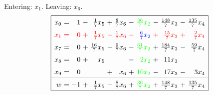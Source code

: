 \documentclass[11pt]{article}
\begin{document}
Entering: $x_{1}$. Leaving: $x_{6}$. 
\begin{equation*}
\renewcommand{\arraystretch}{1.5} %
\begin{array}{|rcrcrcrcrcrcr|}
\hline
x_{0} \mspace{-6mu}&\mspace{-6mu} = \mspace{-6mu}&\mspace{-6mu} 1 \mspace{-6mu}&\mspace{-6mu} - \mspace{-6mu}&\mspace{-6mu} \frac{1}{7} x_{5} \mspace{-6mu}&\mspace{-6mu} + \mspace{-6mu}&\mspace{-6mu} \frac{8}{7} x_{6} \mspace{-6mu}&\mspace{-6mu} - \mspace{-6mu}&\color{green}\mspace{-6mu} \frac{36}{7} x_{2} \mspace{-6mu}&\mspace{-6mu} - \mspace{-6mu}&\mspace{-6mu} \frac{148}{7} x_{3} \mspace{-6mu}&\mspace{-6mu} - \mspace{-6mu}&\mspace{-6mu} \frac{135}{7} x_{4}\\
\color{red}x_{1} \mspace{-6mu}&\color{red}\mspace{-6mu} = \mspace{-6mu}&\color{red}\mspace{-6mu} 0 \mspace{-6mu}&\color{red}\mspace{-6mu} + \mspace{-6mu}&\color{red}\mspace{-6mu} \frac{1}{7} x_{5} \mspace{-6mu}&\color{red}\mspace{-6mu} - \mspace{-6mu}&\color{red}\mspace{-6mu} \frac{1}{7} x_{6} \mspace{-6mu}&\color{red}\mspace{-6mu} - \mspace{-6mu}&\color{blue}\mspace{-6mu} \frac{6}{7} x_{2} \mspace{-6mu}&\color{red}\mspace{-6mu} + \mspace{-6mu}&\color{red}\mspace{-6mu} \frac{15}{7} x_{3} \mspace{-6mu}&\color{red}\mspace{-6mu} + \mspace{-6mu}&\color{red}\mspace{-6mu} \frac{2}{7} x_{4}\\
x_{7} \mspace{-6mu}&\mspace{-6mu} = \mspace{-6mu}&\mspace{-6mu} 0 \mspace{-6mu}&\mspace{-6mu} + \mspace{-6mu}&\mspace{-6mu} \frac{16}{7} x_{5} \mspace{-6mu}&\mspace{-6mu} - \mspace{-6mu}&\mspace{-6mu} \frac{9}{7} x_{6} \mspace{-6mu}&\mspace{-6mu} - \mspace{-6mu}&\color{green}\mspace{-6mu} \frac{61}{7} x_{2} \mspace{-6mu}&\mspace{-6mu} + \mspace{-6mu}&\mspace{-6mu} \frac{184}{7} x_{3} \mspace{-6mu}&\mspace{-6mu} - \mspace{-6mu}&\mspace{-6mu} \frac{59}{7} x_{4}\\
x_{8} \mspace{-6mu}&\mspace{-6mu} = \mspace{-6mu}&\mspace{-6mu} 0 \mspace{-6mu}&\mspace{-6mu} + \mspace{-6mu}&\mspace{-6mu} x_{5} \mspace{-6mu}&\mspace{-6mu}  \mspace{-6mu}&\mspace{-6mu}  \mspace{-6mu}&\mspace{-6mu} - \mspace{-6mu}&\color{green}\mspace{-6mu} 2 x_{2} \mspace{-6mu}&\mspace{-6mu} + \mspace{-6mu}&\mspace{-6mu} 11 x_{3} \mspace{-6mu}&\mspace{-6mu}  \mspace{-6mu}&\mspace{-6mu} \\
x_{9} \mspace{-6mu}&\mspace{-6mu} = \mspace{-6mu}&\mspace{-6mu} 0 \mspace{-6mu}&\mspace{-6mu}  \mspace{-6mu}&\mspace{-6mu}  \mspace{-6mu}&\mspace{-6mu} + \mspace{-6mu}&\mspace{-6mu} x_{6} \mspace{-6mu}&\mspace{-6mu} + \mspace{-6mu}&\color{green}\mspace{-6mu} 10 x_{2} \mspace{-6mu}&\mspace{-6mu} - \mspace{-6mu}&\mspace{-6mu} 17 x_{3} \mspace{-6mu}&\mspace{-6mu} - \mspace{-6mu}&\mspace{-6mu} 3 x_{4}\\
\hline
w \mspace{-6mu}&\mspace{-6mu} = \mspace{-6mu}&\mspace{-6mu} -1 \mspace{-6mu}&\mspace{-6mu} + \mspace{-6mu}&\mspace{-6mu} \frac{1}{7} x_{5} \mspace{-6mu}&\mspace{-6mu} - \mspace{-6mu}&\mspace{-6mu} \frac{8}{7} x_{6} \mspace{-6mu}&\mspace{-6mu} + \mspace{-6mu}&\color{green}\mspace{-6mu} \frac{36}{7} x_{2} \mspace{-6mu}&\mspace{-6mu} + \mspace{-6mu}&\mspace{-6mu} \frac{148}{7} x_{3} \mspace{-6mu}&\mspace{-6mu} + \mspace{-6mu}&\mspace{-6mu} \frac{135}{7} x_{4}\\
\hline
\end{array}
\end{equation*}
\end{document}
